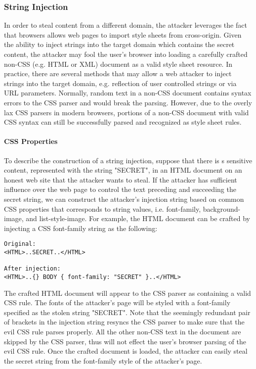 \documentclass{acm_proc_article-sp}
\begin{document}
\subsubsection{String Injection}
In order to steal content from a different domain, the attacker leverages the fact that browsers allows web pages to import style sheets from cross-origin. Given the ability to inject strings into the target domain which contains the secret content, the attacker may fool the user's browser into loading a carefully crafted non-CSS (e.g. HTML or XML) document as a valid style sheet resource. In practice, there are several methods that may allow a web attacker to inject strings into the target domain, e.g. reflection of user controlled strings or via URL parameters. Normally, random text in a non-CSS document contains syntax errors to the CSS parser and would break the parsing. However, due to the overly lax CSS parsers in modern browsers, portions of a non-CSS document with valid CSS syntax can still be successfully parsed and recognized as style sheet rules.

\paragraph{CSS Properties}
To describe the construction of a string injection, suppose that there is s sensitive content, represented with the string "SECRET", in an HTML document on an honest web site that the attacker wants to steal. If the attacker has sufficient influence over the web page to control the text preceding and succeeding the secret string, we can construct the attacker's injection string based on common CSS properties that corresponds to string values, i.e. font-family, background-image, and list-style-image. For example, the HTML document can be crafted by injecting a CSS font-family string as the following:
\begin{verbatim}
Original:
<HTML>..SECRET..</HTML>

After injection:
<HTML>..{} BODY { font-family: "SECRET" }..</HTML>
\end{verbatim}
The crafted HTML document will appear to the CSS parser as containing a valid CSS rule. The fonts of the attacker's page will be styled with a font-family specified as the stolen string "SECRET". Note that the seemingly redundant pair of brackets in the injection string resyncs the CSS parser to make sure that the evil CSS rule parses properly. All the other non-CSS text in the document are skipped by the CSS parser, thus will not effect the user's browser parsing of the evil CSS rule. Once the crafted document is loaded, the attacker can easily steal the secret string from the font-family style of the attacker's page.
\end{document}
